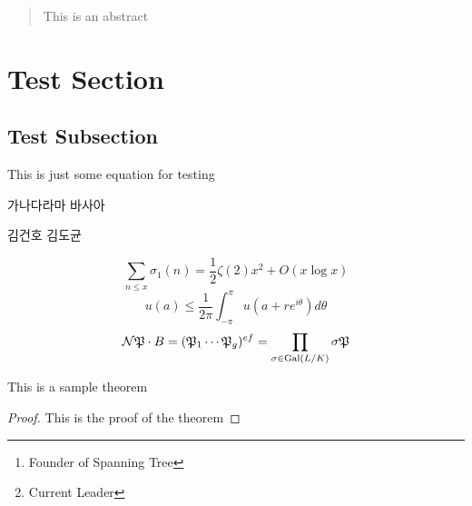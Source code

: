 \documentclass[]{sptr_article}
\author{Springer \and Frondosa \and Monoid\thanks{ Founder of Spanning Tree} \and concinnitas43\thanks{ Current Leader}}
\date{}
\begin{document}
\maketitle


\begin{abstract}
	This is an abstract
\end{abstract}

\tableofcontents

\section{Test Section}

\subsection{Test Subsection}

This is just some equation for testing

가나다라마 바사아

김건호 김도균

\begin{equation}
	\sum_{n \leq x} \sigma_1 (n) = \frac{1}{2} \zeta(2) x^2 + O(x \log x)
\end{equation}
\begin{equation}
	u(a) \leq \frac{1}{2\pi} \int_{-\pi}^\pi u(a + r e^{i \theta}) d\theta
\end{equation}
\begin{equation}
	\mathcal{N} \mathfrak{P} \cdot B = (\mathfrak{P}_1 \cdots \mathfrak{P}_g)^{ef} = \prod_{\sigma \in \operatorname{Gal}(L/K)} \sigma \mathfrak{P}
\end{equation}

\begin{theorem}
	This is a sample theorem
\end{theorem}

\begin{proof}
	This is the proof of the theorem
\end{proof}

\lipsum

\end{document}

